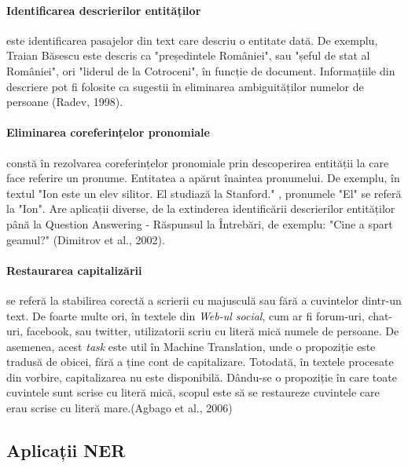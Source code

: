 \paragraph{Identificarea descrierilor entităților}

este identificarea pasajelor din text care descriu o entitate dată. De exemplu, Traian Băsescu este descris ca "președintele României", sau "șeful de stat al României", ori "liderul de la Cotroceni", în funcție de document. Informațiile din descriere pot fi folosite ca sugestii în eliminarea ambiguităților numelor de persoane (Radev, 1998).\cite{Radev98learningcorrelations}

\paragraph{Eliminarea coreferințelor pronomiale}

constă în rezolvarea coreferințelor pronomiale prin descoperirea entității la care face referire un pronume. Entitatea a apărut înaintea pronumelui. De exemplu, în textul "Ion este un elev silitor. El studiază la Stanford." , pronumele "El" se referă la "Ion". Are aplicații diverse, de la extinderea identificării descrierilor entităților până la Question Answering - Răspunsul la Întrebări, de exemplu: "Cine a spart geamul?" (Dimitrov et al., 2002).\cite{Dimitrov02alight-weight}

\paragraph{Restaurarea capitalizării}

se referă la stabilirea corectă a scrierii cu majusculă sau fără a cuvintelor dintr-un text. De foarte multe ori, în textele din \textit{Web-ul social}, cum ar fi forum-uri, chat-uri, facebook, sau twitter, utilizatorii scriu cu literă mică numele de persoane. De asemenea, acest \textit{task} este util în Machine Translation, unde o propoziție este tradusă de obicei, fără a ține cont de capitalizare. Totodată, în textele procesate din vorbire, capitalizarea nu este disponibilă. Dându-se o propoziție în care toate cuvintele sunt scrise cu literă mică, scopul este să se restaureze cuvintele care erau scrise cu literă mare.(Agbago et al., 2006)\cite{Agbago06}



\subsection{Aplicații NER}

